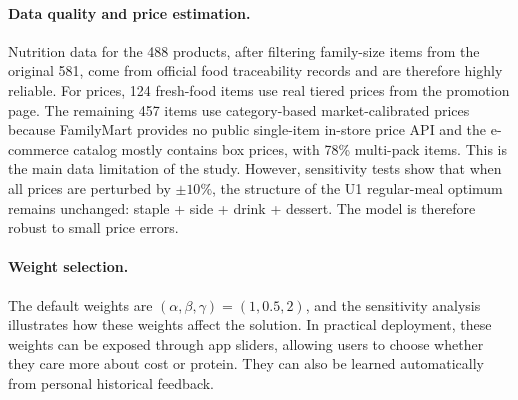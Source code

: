 \documentclass[a4paper]{article}
\begin{document}
\paragraph{Data quality and price estimation.}Nutrition data for the 488 products, after filtering family-size items from the original 581, come from official food traceability records and are therefore highly reliable. For prices, 124 fresh-food items use real tiered prices from the promotion page. The remaining 457 items use category-based market-calibrated prices because FamilyMart provides no public single-item in-store price API and the e-commerce catalog mostly contains box prices, with 78\% multi-pack items. This is the main data limitation of the study. However, sensitivity tests show that when all prices are perturbed by $\pm10\%$, the structure of the U1 regular-meal optimum remains unchanged: staple + side + drink + dessert. The model is therefore robust to small price errors.

\paragraph{Weight selection.}The default weights are $(\alpha, \beta, \gamma)=(1, 0.5, 2)$, and the sensitivity analysis illustrates how these weights affect the solution. In practical deployment, these weights can be exposed through app sliders, allowing users to choose whether they care more about cost or protein. They can also be learned automatically from personal historical feedback.
\end{document}
